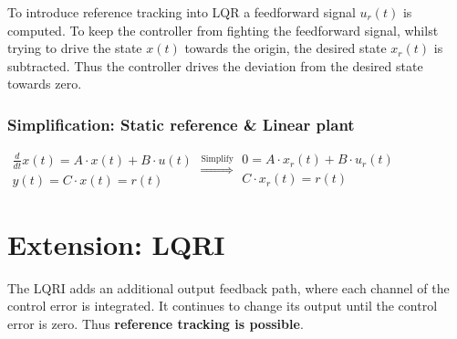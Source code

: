 \documentclass[10pt,a4paper]{scrartcl}
\begin{document}
\begin{multicols*}{3}
	
	To introduce reference tracking into LQR a feedforward signal $u_r(t)$ is computed. To keep the controller from fighting the feedforward signal, whilst trying to drive the state $x(t)$ towards the origin, the desired state $x_r(t)$ is subtracted. Thus the controller drives the deviation from the desired state towards zero.
	
	
	\subsubsection{Simplification: Static reference \& Linear plant}
	\small
	$\begin{matrix}\frac{d}{dt}x(t)=A\cdot x(t)+B\cdot u(t)\\y(t)=C\cdot x(t)=r(t)\end{matrix}\overset{\text{Simplify}}{\Longrightarrow}\begin{matrix}0=A\cdot x_r(t)+B\cdot u_r(t)\\C\cdot x_r(t)=r(t)\end{matrix}$\normalsize
	
	
	
	
	\section[LQRI]{Extension: LQRI}
	
	
	The LQRI adds an additional output feedback path, where each channel of the control error is integrated. It continues to change its output until the control error is zero. Thus \textbf{reference tracking is possible}.
	

\end{multicols*}
\end{document}
